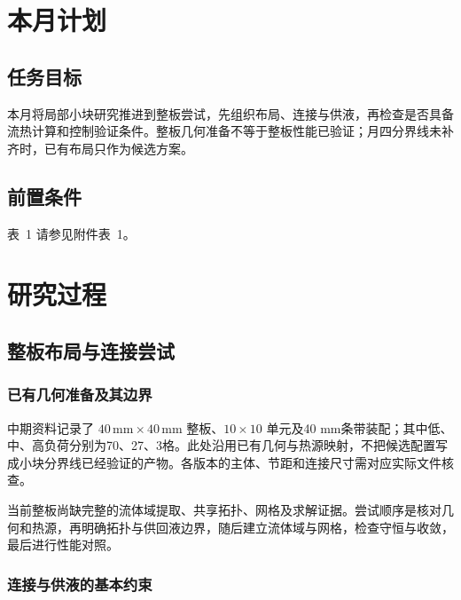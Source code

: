 \documentclass[stage2,fontset=fandol]{ydzjreport}
\makeatletter
\newcommand{\submissionnumber}[1]{\def\@currentlabel{#1}}
\makeatother
\begin{document}
\makestagetwohead

\section{本月计划}

\subsection{任务目标}

本月将局部小块研究推进到整板尝试，先组织布局、连接与供液，再检查是否具备流热计算和控制验证条件。整板几何准备不等于整板性能已验证；月四分界线未补齐时，已有布局只作为候选方案。

\subsection{前置条件}


\par\noindent \begingroup\submissionnumber{1}\label{tab:pre}\endgroup 表~1 请参见附件表~1。\par




\section{研究过程}

\subsection{整板布局与连接尝试}

\subsubsection{已有几何准备及其边界}
中期资料记录了 $40\,\mathrm{mm}\times40\,\mathrm{mm}$ 整板、$10\times10$ 单元及40 mm条带装配；其中低、中、高负荷分别为70、27、3格。此处沿用已有几何与热源映射，不把候选配置写成小块分界线已经验证的产物。各版本的主体、节距和连接尺寸需对应实际文件核查。

当前整板尚缺完整的流体域提取、共享拓扑、网格及求解证据。尝试顺序是核对几何和热源，再明确拓扑与供回液边界，随后建立流体域与网格，检查守恒与收敛，最后进行性能对照。

\subsubsection{连接与供液的基本约束}
\end{document}

